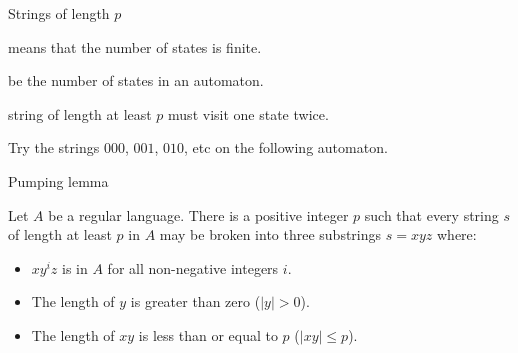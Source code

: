 \begin{frame}[fragile]{Strings of length $p$}
  \begin{description}
    \setlength\itemsep{3mm}
    \item[Finite] means that the number of states is finite.
    \item[Let $p$] be the number of states in an automaton.
    \item[Every] string of length at least $p$ must visit one state twice.
  \end{description}
\vspace{4mm}

    \vspace{5mm}
  Try the strings $000$, $001$, $010$, etc on the following automaton.
  \begin{center}
  \end{center}

\end{frame}

\begin{frame}{Pumping lemma}
  \begin{theorem}
    \vspace{2mm}
    Let $A$ be a regular language.
    There is a positive integer $p$ such that every string $s$ of length at least $p$ in $A$ may be broken into three substrings \( s = xyz \) where:

    \begin{itemize}
      \item \( xy^iz \) is in $A$ for all non-negative integers $i$.
      \item The length of $y$ is greater than zero ($|y| > 0$).
      \item The length of $xy$ is less than or equal to $p$ ($|xy| \leq p$).
    \end{itemize}
    \vspace{2mm}
  \end{theorem}

\end{frame}



